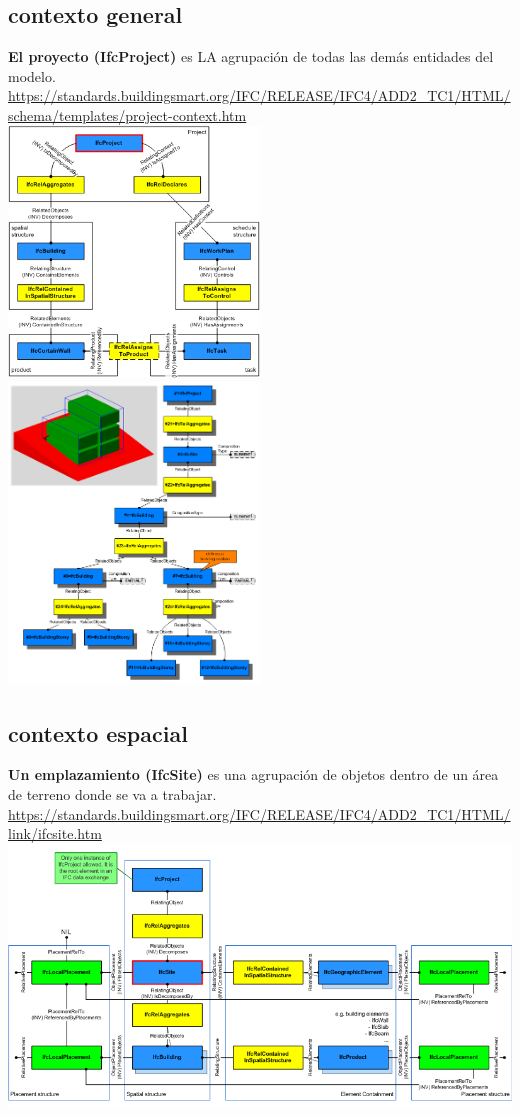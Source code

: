 \documentclass[spanish,12pt,a4paper,final,oneside]{book}
\begin{document}
\subsection{contexto general}
\textbf{El proyecto (IfcProject)} es LA agrupación de todas las demás entidades del modelo.
\\ \url{https://standards.buildingsmart.org/IFC/RELEASE/IFC4/ADD2_TC1/HTML/schema/templates/project-context.htm}
\\ \includegraphics[width=0.5\textwidth]{principales relaciones de IfcProject}
\includegraphics[width=0.5\textwidth]{principales relaciones de IfcSpacialStructureElement}

\subsection{contexto espacial}
\textbf{Un emplazamiento (IfcSite)} es una agrupación de objetos dentro de un área de terreno donde se va a trabajar.
\\ \url{https://standards.buildingsmart.org/IFC/RELEASE/IFC4/ADD2_TC1/HTML/link/ifcsite.htm}
\\ \includegraphics[width=\textwidth]{principales relaciones de IfcSite}
\end{document}
